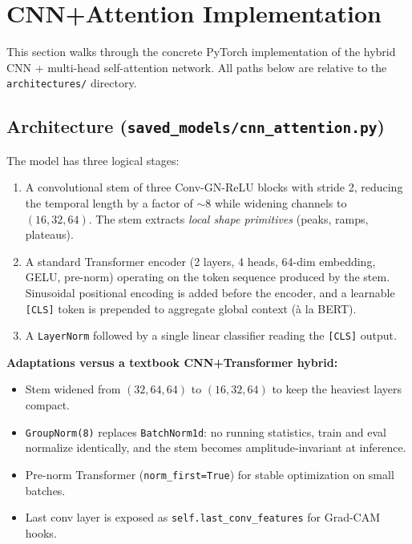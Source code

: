 \section{CNN+Attention Implementation}

This section walks through the concrete PyTorch implementation of the hybrid CNN + multi-head self-attention network. All paths below are relative to the \texttt{architectures/} directory.

\subsection{Architecture (\texttt{saved\_models/cnn\_attention.py})}

The model has three logical stages:
\begin{enumerate}
    \item A convolutional stem of three Conv-GN-ReLU blocks with stride 2, reducing the temporal length by a factor of $\sim 8$ while widening channels to $(16,32,64)$. The stem extracts \emph{local shape primitives} (peaks, ramps, plateaus).
    \item A standard Transformer encoder (2 layers, 4 heads, 64-dim embedding, GELU, pre-norm) operating on the token sequence produced by the stem. Sinusoidal positional encoding is added before the encoder, and a learnable \texttt{[CLS]} token is prepended to aggregate global context (à la BERT).
    \item A \texttt{LayerNorm} followed by a single linear classifier reading the \texttt{[CLS]} output.
\end{enumerate}

\textbf{Adaptations versus a textbook CNN+Transformer hybrid:}
\begin{itemize}
    \item Stem widened from $(32,64,64)$ to $(16,32,64)$ to keep the heaviest layers compact.
    \item \texttt{GroupNorm(8)} replaces \texttt{BatchNorm1d}: no running statistics, train and eval normalize identically, and the stem becomes amplitude-invariant at inference.
    \item Pre-norm Transformer (\texttt{norm\_first=True}) for stable optimization on small batches.
    \item Last conv layer is exposed as \texttt{self.last\_conv\_features} for Grad-CAM hooks.
\end{itemize}

